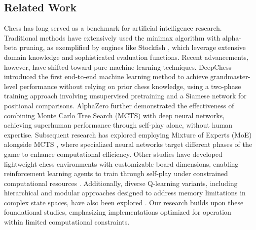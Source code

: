 \documentclass[journal, a4paper]{IEEEtran}
\begin{document}
\subsection{Related Work}
\noindent Chess has long served as a benchmark for artificial intelligence research. Traditional methods have extensively used the minimax algorithm with alpha-beta pruning, as exemplified by engines like Stockfish \cite{stockfish}, which leverage extensive domain knowledge and sophisticated evaluation functions. Recent advancements, however, have shifted toward pure machine-learning techniques. DeepChess \cite{David_2016} introduced the first end-to-end machine learning method to achieve grandmaster-level performance without relying on prior chess knowledge, using a two-phase training approach involving unsupervised pretraining and a Siamese network for positional comparisons. AlphaZero \cite{silver2018alphazero} further demonstrated the effectiveness of combining Monte Carlo Tree Search (MCTS) with deep neural networks, achieving superhuman performance through self-play alone, without human expertise. Subsequent research has explored employing Mixture of Experts (MoE) alongside MCTS \cite{helfenstein2024checkmatingoneusingmany}, where specialized neural networks target different phases of the game to enhance computational efficiency. Other studies have developed lightweight chess environments with customizable board dimensions, enabling reinforcement learning agents to train through self-play under constrained computational resources \cite{hammersborg2022reinforcementlearningadaptablechess}. Additionally, diverse Q-learning variants, including hierarchical and modular approaches designed to address memory limitations in complex state spaces, have also been explored \cite{8836506}. Our research builds upon these foundational studies, emphasizing implementations optimized for operation within limited computational constraints.




\end{document}
